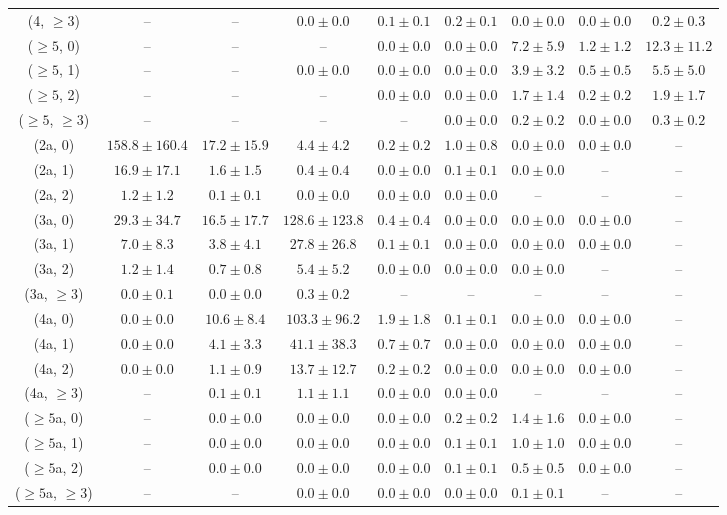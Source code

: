 \begin{table}[h!]
{\begin{tabular}{ccccccccc}
	(4, $\ge3$) & -- & -- & $0.0\pm 0.0$ & $0.1\pm 0.1$ & $0.2\pm 0.1$ & $0.0\pm 0.0$ & $0.0\pm 0.0$ & $0.2\pm 0.3$ \\[0.5ex] 
	($\ge5$, 0) & -- & -- & -- & $0.0\pm 0.0$ & $0.0\pm 0.0$ & $7.2\pm 5.9$ & $1.2\pm 1.2$ & $12.3\pm 11.2$ \\[0.5ex] 
	($\ge5$, 1) & -- & -- & $0.0\pm 0.0$ & $0.0\pm 0.0$ & $0.0\pm 0.0$ & $3.9\pm 3.2$ & $0.5\pm 0.5$ & $5.5\pm 5.0$ \\[0.5ex] 
	($\ge5$, 2) & -- & -- & -- & $0.0\pm 0.0$ & $0.0\pm 0.0$ & $1.7\pm 1.4$ & $0.2\pm 0.2$ & $1.9\pm 1.7$ \\[0.5ex] 
	($\ge5$, $\ge3$) & -- & -- & -- & -- & $0.0\pm 0.0$ & $0.2\pm 0.2$ & $0.0\pm 0.0$ & $0.3\pm 0.2$ \\[0.5ex] 
	(2a, 0) & $158.8\pm 160.4$ & $17.2\pm 15.9$ & $4.4\pm 4.2$ & $0.2\pm 0.2$ & $1.0\pm 0.8$ & $0.0\pm 0.0$ & $0.0\pm 0.0$ & -- \\[0.5ex] 
	(2a, 1) & $16.9\pm 17.1$ & $1.6\pm 1.5$ & $0.4\pm 0.4$ & $0.0\pm 0.0$ & $0.1\pm 0.1$ & $0.0\pm 0.0$ & -- & -- \\[0.5ex] 
	(2a, 2) & $1.2\pm 1.2$ & $0.1\pm 0.1$ & $0.0\pm 0.0$ & $0.0\pm 0.0$ & $0.0\pm 0.0$ & -- & -- & -- \\[0.5ex] 
	(3a, 0) & $29.3\pm 34.7$ & $16.5\pm 17.7$ & $128.6\pm 123.8$ & $0.4\pm 0.4$ & $0.0\pm 0.0$ & $0.0\pm 0.0$ & $0.0\pm 0.0$ & -- \\[0.5ex] 
	(3a, 1) & $7.0\pm 8.3$ & $3.8\pm 4.1$ & $27.8\pm 26.8$ & $0.1\pm 0.1$ & $0.0\pm 0.0$ & $0.0\pm 0.0$ & $0.0\pm 0.0$ & -- \\[0.5ex] 
	(3a, 2) & $1.2\pm 1.4$ & $0.7\pm 0.8$ & $5.4\pm 5.2$ & $0.0\pm 0.0$ & $0.0\pm 0.0$ & $0.0\pm 0.0$ & -- & -- \\[0.5ex] 
	(3a, $\ge3$) & $0.0\pm 0.1$ & $0.0\pm 0.0$ & $0.3\pm 0.2$ & -- & -- & -- & -- & -- \\[0.5ex] 
	(4a, 0) & $0.0\pm 0.0$ & $10.6\pm 8.4$ & $103.3\pm 96.2$ & $1.9\pm 1.8$ & $0.1\pm 0.1$ & $0.0\pm 0.0$ & $0.0\pm 0.0$ & -- \\[0.5ex] 
	(4a, 1) & $0.0\pm 0.0$ & $4.1\pm 3.3$ & $41.1\pm 38.3$ & $0.7\pm 0.7$ & $0.0\pm 0.0$ & $0.0\pm 0.0$ & $0.0\pm 0.0$ & -- \\[0.5ex] 
	(4a, 2) & $0.0\pm 0.0$ & $1.1\pm 0.9$ & $13.7\pm 12.7$ & $0.2\pm 0.2$ & $0.0\pm 0.0$ & $0.0\pm 0.0$ & $0.0\pm 0.0$ & -- \\[0.5ex] 
	(4a, $\ge3$) & -- & $0.1\pm 0.1$ & $1.1\pm 1.1$ & $0.0\pm 0.0$ & $0.0\pm 0.0$ & -- & -- & -- \\[0.5ex] 
	($\ge5$a, 0) & -- & $0.0\pm 0.0$ & $0.0\pm 0.0$ & $0.0\pm 0.0$ & $0.2\pm 0.2$ & $1.4\pm 1.6$ & $0.0\pm 0.0$ & -- \\[0.5ex] 
	($\ge5$a, 1) & -- & $0.0\pm 0.0$ & $0.0\pm 0.0$ & $0.0\pm 0.0$ & $0.1\pm 0.1$ & $1.0\pm 1.0$ & $0.0\pm 0.0$ & -- \\[0.5ex] 
	($\ge5$a, 2) & -- & $0.0\pm 0.0$ & $0.0\pm 0.0$ & $0.0\pm 0.0$ & $0.1\pm 0.1$ & $0.5\pm 0.5$ & $0.0\pm 0.0$ & -- \\[0.5ex] 
	($\ge5$a, $\ge3$) & -- & -- & $0.0\pm 0.0$ & $0.0\pm 0.0$ & $0.0\pm 0.0$ & $0.1\pm 0.1$ & -- & -- \\[0.5ex] 
	\hline
	\hline
\end{tabular}}
\end{table}
